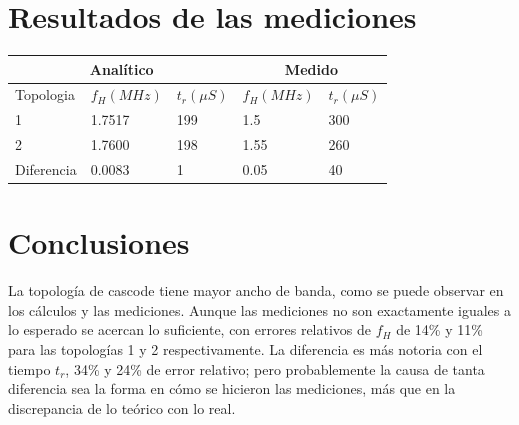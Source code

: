 \documentclass[letterpaper, 10 pt, conference]{ieeeconf}  %
\begin{document}
\section{Resultados de las mediciones}

 \begin{table}[H]
   \centering
   \begin{tabular}{|lll|ll|}
     \hline
     \multicolumn{3}{|c|}{Analítico}                                                    & \multicolumn{2}{c|}{Medido}                      \\ \hline
     \multicolumn{1}{|l|}{Topologia}  & \multicolumn{1}{l|}{$f_H (MHz)$}  & $t_r (\mu S)$ & \multicolumn{1}{l|}{$f_H (MHz)$} & $t_r (\mu  S)$ \\ \hline
     \multicolumn{1}{|l|}{1}          & \multicolumn{1}{l|}{1.7517}       & 199         & \multicolumn{1}{l|}{1.5}           & 300         \\ \hline
     \multicolumn{1}{|l|}{2}          & \multicolumn{1}{l|}{1.7600}       & 198         & \multicolumn{1}{l|}{1.55}          & 260         \\ \hline
     \multicolumn{1}{|l|}{Diferencia} & \multicolumn{1}{l|}{0.0083}       & 1           & \multicolumn{1}{l|}{0.05}          & 40          \\ \hline
   \end{tabular}
 \end{table}

\section{Conclusiones}
La topología de cascode tiene mayor ancho de banda, como se puede observar en los cálculos y las mediciones. Aunque las mediciones no son exactamente iguales a lo esperado se acercan lo suficiente, con errores relativos de $f_H$ de 14\% y 11\% para las topologías 1 y 2 respectivamente. La diferencia es más notoria con el tiempo $t_r$, 34\% y 24\% de error relativo; pero probablemente la causa de tanta diferencia sea la forma en cómo se hicieron las mediciones, más que en la discrepancia de lo teórico con lo real.
\end{document}
